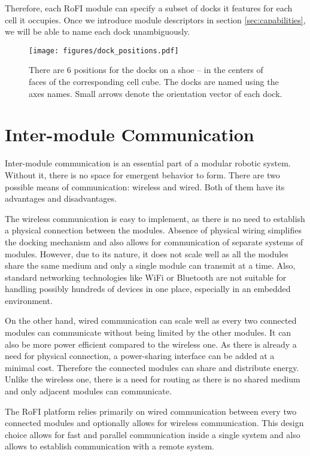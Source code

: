 Therefore, each RoFI module can specify a subset of docks it features for each
cell it occupies. Once we introduce module descriptors in section
\ref{sec:capabilities}, we will be able to name each dock unambiguously.

\begin{figure}[t]
    \centering
    \texttt{[image: figures/dock\_positions.pdf]}
    \caption{There are 6 positions for the docks on a shoe -- in the
    centers of faces of the corresponding cell cube. The docks are named using
    the axes names. Small arrows denote the orientation vector of each dock.}
    \label{fig:dock_positions}
\end{figure}

\section{Inter-module Communication}\label{sec:communication}

Inter-module communication is an essential part of a modular robotic system.
Without it, there is no space for emergent behavior to form. There are two
possible means of communication: wireless and wired. Both of them have its
advantages and disadvantages.

The wireless communication is easy to implement, as there is no need to
establish a physical connection between the modules. Absence of physical wiring
simplifies the docking mechanism and also allows for communication of separate
systems of modules. However, due to its nature, it does not scale well as all
the modules share the same medium and only a single module can transmit at a
time. Also, standard networking technologies like WiFi or Bluetooth are not
suitable for handling possibly hundreds of devices in one place, especially in
an embedded environment.

On the other hand, wired communication can scale well as every two connected
modules can communicate without being limited by the other modules. It can also
be more power efficient compared to the wireless one. As there is already a need
for physical connection, a power-sharing interface can be added at a minimal
cost. Therefore the connected modules can share and distribute energy. Unlike
the wireless one, there is a need for routing as there is no shared medium and
only adjacent modules can communicate.

The RoFI platform relies primarily on wired communication between every two
connected modules and optionally allows for wireless communication. This
design choice allows for fast and parallel communication inside a single system
and also allows to establish communication with a remote system.

